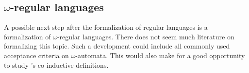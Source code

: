 \subsection{$\omega$-regular languages}
A possible next step after the formalization of regular languages is a formalization of $\omega$-regular languages.
There does not seem much literature on formalizing this topic.
Such a development could include all commonly used acceptance criteria on $\omega$-automata.
This would also make for a good opportunity to study \coq's co-inductive definitions. 
